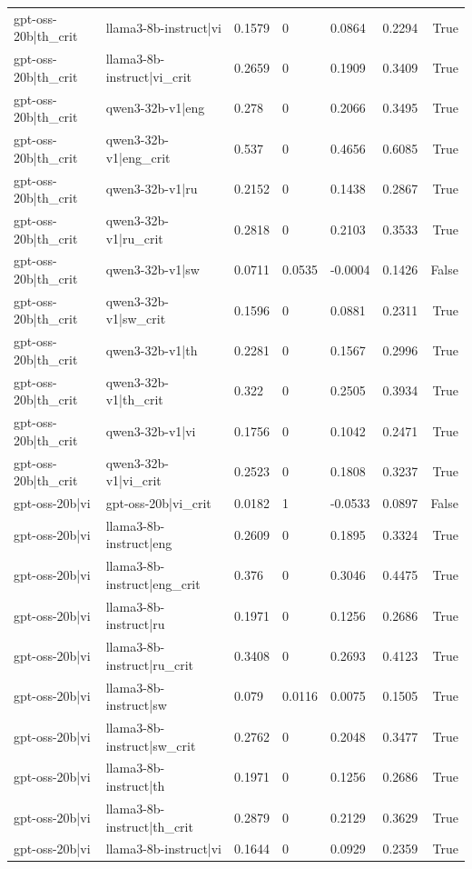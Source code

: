 \begin{table}
\begin{tabular}{llllllr}
gpt-oss-20b|th_crit & llama3-8b-instruct|vi & 0.1579 & 0 & 0.0864 & 0.2294 & True \\
gpt-oss-20b|th_crit & llama3-8b-instruct|vi_crit & 0.2659 & 0 & 0.1909 & 0.3409 & True \\
gpt-oss-20b|th_crit & qwen3-32b-v1|eng & 0.278 & 0 & 0.2066 & 0.3495 & True \\
gpt-oss-20b|th_crit & qwen3-32b-v1|eng_crit & 0.537 & 0 & 0.4656 & 0.6085 & True \\
gpt-oss-20b|th_crit & qwen3-32b-v1|ru & 0.2152 & 0 & 0.1438 & 0.2867 & True \\
gpt-oss-20b|th_crit & qwen3-32b-v1|ru_crit & 0.2818 & 0 & 0.2103 & 0.3533 & True \\
gpt-oss-20b|th_crit & qwen3-32b-v1|sw & 0.0711 & 0.0535 & -0.0004 & 0.1426 & False \\
gpt-oss-20b|th_crit & qwen3-32b-v1|sw_crit & 0.1596 & 0 & 0.0881 & 0.2311 & True \\
gpt-oss-20b|th_crit & qwen3-32b-v1|th & 0.2281 & 0 & 0.1567 & 0.2996 & True \\
gpt-oss-20b|th_crit & qwen3-32b-v1|th_crit & 0.322 & 0 & 0.2505 & 0.3934 & True \\
gpt-oss-20b|th_crit & qwen3-32b-v1|vi & 0.1756 & 0 & 0.1042 & 0.2471 & True \\
gpt-oss-20b|th_crit & qwen3-32b-v1|vi_crit & 0.2523 & 0 & 0.1808 & 0.3237 & True \\
gpt-oss-20b|vi & gpt-oss-20b|vi_crit & 0.0182 & 1 & -0.0533 & 0.0897 & False \\
gpt-oss-20b|vi & llama3-8b-instruct|eng & 0.2609 & 0 & 0.1895 & 0.3324 & True \\
gpt-oss-20b|vi & llama3-8b-instruct|eng_crit & 0.376 & 0 & 0.3046 & 0.4475 & True \\
gpt-oss-20b|vi & llama3-8b-instruct|ru & 0.1971 & 0 & 0.1256 & 0.2686 & True \\
gpt-oss-20b|vi & llama3-8b-instruct|ru_crit & 0.3408 & 0 & 0.2693 & 0.4123 & True \\
gpt-oss-20b|vi & llama3-8b-instruct|sw & 0.079 & 0.0116 & 0.0075 & 0.1505 & True \\
gpt-oss-20b|vi & llama3-8b-instruct|sw_crit & 0.2762 & 0 & 0.2048 & 0.3477 & True \\
gpt-oss-20b|vi & llama3-8b-instruct|th & 0.1971 & 0 & 0.1256 & 0.2686 & True \\
gpt-oss-20b|vi & llama3-8b-instruct|th_crit & 0.2879 & 0 & 0.2129 & 0.3629 & True \\
gpt-oss-20b|vi & llama3-8b-instruct|vi & 0.1644 & 0 & 0.0929 & 0.2359 & True \\

\end{tabular}
\end{table}
